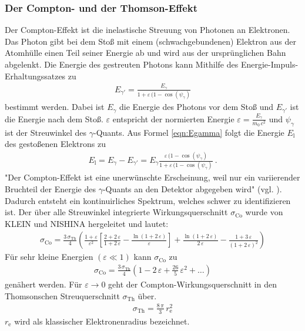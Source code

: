 \subsubsection{Der Compton- und der Thomson-Effekt}
Der Compton-Effekt ist die inelastische Streuung von Photonen an Elektronen. Das Photon gibt bei dem Stoß mit einem (schwachgebundenen) Elektron aus der Atomhülle einen Teil seiner Energie ab und wird aus der ursprünglichen Bahn abgelenkt. Die Energie des gestreuten Photons kann Mithilfe des Energie-Impuls-Erhaltungssatzes zu
\begin{align}
	E_{\gamma'} = \frac{E_{\gamma}}{1 + \varepsilon\,(1-\cos(\psi_{\gamma})}
	\label{eqn:Egamma}
\end{align}
bestimmt werden. Dabei ist $E_{\gamma}$ die Energie des Photons vor dem Stoß und $E_{\gamma'}$ ist die Energie nach dem Stoß. $\varepsilon$ entspricht der normierten Energie $\varepsilon = \frac{E_{\gamma}}{m_0\,c^2}$ und $\psi_{\gamma}$ ist der Streuwinkel des $\gamma$-Quants. Aus Formel \eqref{eqn:Egamma} folgt die Energie $E_\text{l}$ des gestoßenen Elektrons zu
\begin{align}
	E_\text{l} = E_{\gamma} - E_{\gamma'} = E_{\gamma} \frac{\varepsilon\,(1-\cos(\psi_{\gamma})}{1 + \varepsilon\,(1-\cos(\psi_{\gamma})} \ .
	\label{eqn:El}
\end{align}
"Der Compton-Effekt ist eine unerwünschte Erscheinung, weil nur ein variierender Bruchteil der Energie des $\gamma$-Quants an den Detektor abgegeben wird" (vgl. \cite[5]{V18}). Dadurch entsteht ein kontinuirliches Spektrum, welches schwer zu identifizieren ist. Der über alle Streuwinkel integrierte Wirkungsquerschnitt $\sigma_\text{Co}$ wurde von KLEIN und NISHINA hergeleitet und lautet:
\begin{align}
	\sigma_\text{Co} = \frac{3\,\sigma_\text{Th}}{4} \left( \frac{1+\varepsilon}{\varepsilon^2} \left[\frac{2+2\,\varepsilon}{1+2\,\varepsilon} - \frac{\ln(1+2\,\varepsilon)}{\varepsilon} \right] + \frac{\ln(1+2\,\varepsilon)}{2\,\varepsilon} - \frac{1+3\,\varepsilon}{(1+2\,\varepsilon)^2} \right)
\end{align}
Für sehr kleine Energien $(\varepsilon \ll 1)$ kann $\sigma_\text{Co}$ zu
\begin{align}
	\sigma_\text{Co} = \frac{3\,\sigma_\text{Th}}{4} \left(1 - 2\,\varepsilon + \frac{26}{5}\,\varepsilon^2 + \dots \right)
\end{align}
genähert werden. Für $\varepsilon \rightarrow 0$ geht der Compton-Wirkungsquerschnitt in den Thomsonschen Streuquerschnitt $\sigma_\text{Th}$ über.
\begin{align}
	\sigma_\text{Th} = \frac{8\,\pi}{3}\,r_\text{e}^2
\end{align}
$r_\text{e}$ wird als klassischer Elektronenradius bezeichnet.



